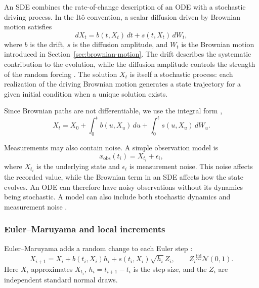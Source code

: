 An SDE combines the rate-of-change description of an ODE with a stochastic
driving process. In the It\^o convention, a scalar diffusion driven by Brownian
motion satisfies
\begin{equation}
    dX_t=b(t,X_t)\,dt+s(t,X_t)\,dW_t,
    \label{eq:sde}
\end{equation}
where $b$ is the drift, $s$ is the diffusion amplitude, and $W_t$ is the
Brownian motion introduced in Section~\ref{sec:brownian-motion}.
The drift describes the systematic contribution to the evolution, while the
diffusion amplitude controls the strength of the random forcing
\parencite{SarkkaSolin2019}. The solution $X_t$ is itself a
stochastic process: each realization of the driving Brownian motion generates
a state trajectory for a given initial condition when a unique solution exists.

Since Brownian paths are not differentiable, we use the integral form
\parencite{SarkkaSolin2019},
\begin{equation}
    X_t=X_0+\int_0^t b(u,X_u)\,du
        +\int_0^t s(u,X_u)\,dW_u.
    \label{eq:sde-integral}
\end{equation}

Measurements may also contain noise. A simple observation model is
\begin{equation}
    x_{\mathrm{obs}}(t_i)=X_{t_i}+\epsilon_i,
    \label{eq:noisy-observations}
\end{equation}
where $X_{t_i}$ is the underlying state and $\epsilon_i$ is measurement noise.
This noise affects the recorded value, while the Brownian term in an SDE
affects how the state evolves. An ODE can therefore have noisy observations
without its dynamics being stochastic. A model can also include both
stochastic dynamics and measurement noise \parencite{SarkkaSolin2019}.

\subsubsection{Euler--Maruyama and local increments}

Euler--Maruyama adds a random change to each Euler step
\parencite{SarkkaSolin2019}:
\begin{equation}
    X_{i+1}=X_i+b(t_i,X_i)h_i
       +s(t_i,X_i)\sqrt{h_i}\,Z_i,
    \qquad Z_i\stackrel{\mathrm{iid}}{\sim}\mathcal{N}(0,1).
    \label{eq:euler-maruyama}
\end{equation}
Here $X_i$ approximates $X_{t_i}$, $h_i=t_{i+1}-t_i$ is the step size,
and the $Z_i$ are independent standard normal draws.

